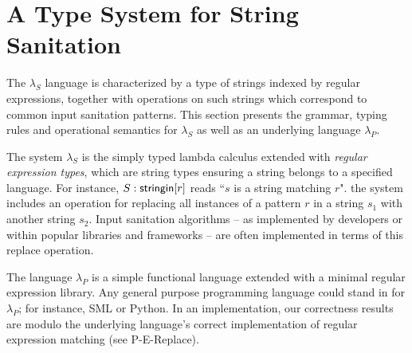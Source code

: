 \documentclass{acm_proc_article-sp}
\theoremstyle{definition}
\newcommand{\lambdas}{\lambda_S}
\newcommand{\lambdap}{\lambda_P}
\newcommand{\stringin}[1]{{\sf stringin}[#1]}
\begin{document}
%
%

\section{A Type System for String Sanitation}

The $\lambdas$ language is characterized by a type of strings indexed by regular
expressions, together with operations on such strings which correspond to common
input sanitation patterns.
This section presents the grammar, typing rules and operational semantics for
$\lambdas$ as well as an underlying language $\lambdap$.

The system $\lambdas$ is the simply typed lambda calculus extended with \emph{regular expression types}, which are string
types ensuring a string belongs to a specified language. For instance, 
$S : \stringin{r}$ reads ``$s$ is a string matching $r$".
the system includes an operation for replacing all instances of a pattern $r$ in a string $s_1$ with another string $s_2$. 
Input sanitation algorithms -- as implemented by developers or within popular libraries and frameworks -- are often implemented in terms of this replace operation.

The language $\lambdap$ is a simple functional language extended with a minimal regular expression library.
Any general purpose programming language could stand in for $\lambdap$; for instance, SML or Python.
In an implementation, our correctness results are modulo the underlying language's correct implementation of regular expression matching (see P-E-Replace).
\end{document}
